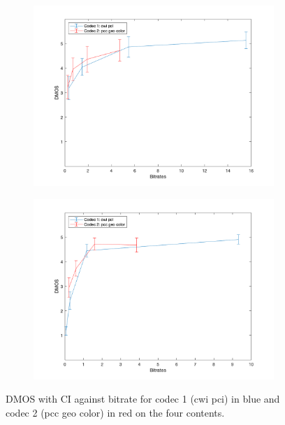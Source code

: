 \documentclass{article}
\begin{document}
\begin{figure}
\begin{subfigure}[b]{0.49 \textwidth}
\end{subfigure}
\begin{subfigure}[b]{0.49 \textwidth}
\includegraphics[width=\textwidth]{Figures/task1/dmos_phil.png}
\end{subfigure}
\begin{subfigure}[b]{0.49 \textwidth}
\includegraphics[width=\textwidth]{Figures/task1/dmos_rhetorician.png}
\end{subfigure}
\caption{DMOS with CI against bitrate for codec 1 (cwi pci) in blue and codec 2 (pcc geo color) in red on the four contents.}
\label{fig:dmos_br}
\end{figure}
\end{document}
